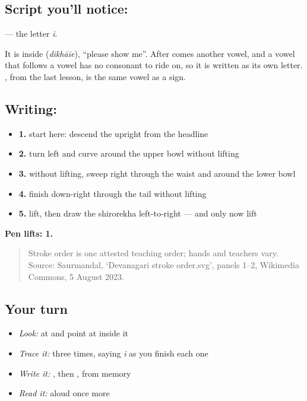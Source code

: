 \subsection*{Script you'll notice: }
\textbf{} — the letter \emph{i}.

It is inside \textbf{} (\emph{dikhāie}), \textquotedblleft{}please show me\textquotedblright{}. After \textbf{} comes another vowel, and a vowel that follows a vowel has no consonant to ride on, so it is written as its own letter. \textbf{}, from the last lesson, is the same vowel as a sign.

\subsection*{Writing: }

\begin{itemize}
\raggedright
  \item \textbf{1.} start here: descend the upright from the headline
  \item \textbf{2.} turn left and curve around the upper bowl without lifting
  \item \textbf{3.} without lifting, sweep right through the waist and around the lower bowl
  \item \textbf{4.} finish down-right through the tail without lifting
  \item \textbf{5.} lift, then draw the shirorekha left-to-right — and only now lift
\end{itemize}

\textbf{Pen lifts: 1.}

\begin{quote}
Stroke order is one attested teaching order; hands and teachers vary. Source: Saurmandal, ‘Devanagari  stroke order.svg’, panels 1–2, Wikimedia Commons, 5 August 2023.
\end{quote}

\subsection*{Your turn}
\begin{itemize}
\raggedright
  \item \emph{Look:} at \textbf{} and point at  inside it
  \item \emph{Trace it:}  three times, saying \emph{i} as you finish each one
  \item \emph{Write it:} , then , from memory
  \item \emph{Read it:} \textbf{} aloud once more
\end{itemize}

